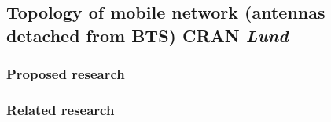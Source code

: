 \subsection{Topology of mobile network (antennas detached from BTS) CRAN \emph{Lund}}
\subsubsection{Proposed research}
\subsubsection{Related research}